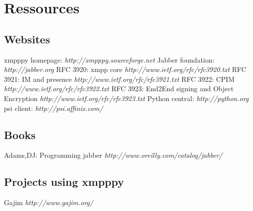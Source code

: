 \chapter{Ressources}


\section{Websites}
xmpppy homepage:		\textit{http://xmpppy.sourceforge.net}
\newline
Jabber foundation:		\textit{http://jabber.org}
\newline
\newline
RFC 3920: xmpp core		\textit{http://www.ietf.org/rfc/rfc3920.txt}
\newline
RFC 3921: IM and presence	\textit{http://www.ietf.org/rfc/rfc3921.txt}
\newline
RFC 3922: CPIM			\textit{http://www.ietf.org/rfc/rfc3922.txt}
\newline
RFC 3923: End2End signing and Object Encryption	\textit{http://www.ietf.org/rfc/rfc3923.txt}
\newline
\newline
Python central:			\textit{http://python.org}
\newline
psi client:			\textit{http://psi.affinix.com/}

\section{Books}
Adams,DJ: Programming jabber	\textit{http://www.oreilly.com/catalog/jabber/}

\section{Projects using xmpppy}
Gajim			\textit{http://www.gajim.org/}